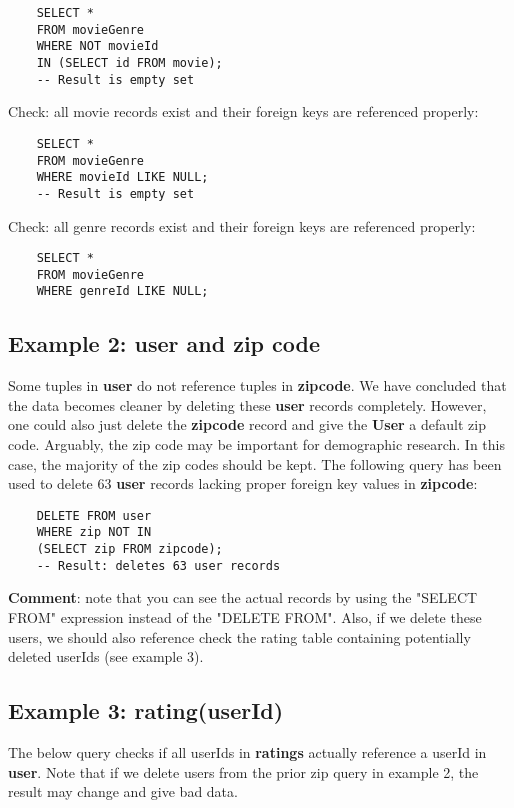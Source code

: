 \begin{verbatim}
	SELECT * 
	FROM movieGenre 
	WHERE NOT movieId
	IN (SELECT id FROM movie); 
	-- Result is empty set 
\end{verbatim}

\newpage

\noindent Check: all movie records exist and their foreign keys are referenced properly:

\begin{verbatim}
	SELECT * 
	FROM movieGenre
	WHERE movieId LIKE NULL; 
	-- Result is empty set 
\end{verbatim}

\noindent Check: all genre records exist and their foreign keys are referenced properly: 

\begin{verbatim}
	SELECT * 
	FROM movieGenre
	WHERE genreId LIKE NULL; 
\end{verbatim}

\subsection{Example 2: user and zip code}
Some tuples in \textbf{user} do not reference tuples in \textbf{zipcode}. We have concluded that the data becomes cleaner by deleting these \textbf{user} records completely. However, one could also just delete the \textbf{zipcode} record and give the \textbf{User} a default zip code. Arguably, the zip code may be important for demographic research. In this case, the majority of the zip codes should be kept. The following query has been used to delete 63 \textbf{user} records lacking proper foreign key values in \textbf{zipcode}: 

\begin{verbatim}
	DELETE FROM user
	WHERE zip NOT IN 
	(SELECT zip FROM zipcode); 
	-- Result: deletes 63 user records 
\end{verbatim}

\noindent \textbf{Comment}: note that you can see the actual records by using the "SELECT FROM" expression instead of the "DELETE FROM". Also, if we delete these users, we should also reference check the rating table containing potentially deleted userIds (see example 3). 

\subsection{Example 3: rating(userId)}
The below query checks if all userIds in \textbf{ratings} actually reference a userId in \textbf{user}. Note that if we delete users from the prior zip query in example 2, the result may change and give bad data.

